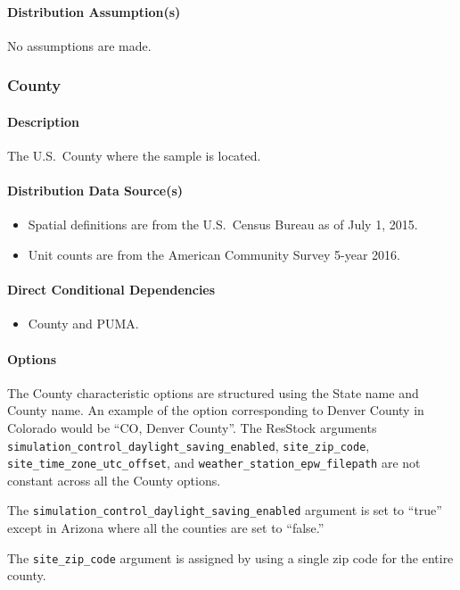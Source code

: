 \paragraph{Distribution Assumption(s)}
No assumptions are made.


\subsubsection{County}
\paragraph{Description}
The U.S.~County where the sample is located.

\paragraph{Distribution Data Source(s)}
\begin{itemize} 
\item
  Spatial definitions are from the U.S.~Census Bureau as of July 1,
  2015.
\item
  Unit counts are from the American Community Survey 5-year 2016.
\end{itemize}

\paragraph{Direct Conditional Dependencies}
\begin{itemize}
    \item County and PUMA.
\end{itemize}

\paragraph{Options}
The County characteristic options are structured using the State name and County name. An example of the option corresponding to Denver County in Colorado would be ``CO, Denver County''. The ResStock arguments \texttt{simulation\_control\_daylight\_saving\_enabled}, \texttt{site\_zip\_code}, \texttt{site\_time\_zone\_utc\_offset}, and \texttt{weather\_station\_epw\_filepath} are not constant across all the County options. 

The \texttt{simulation\_control\_daylight\_saving\_enabled} argument is set to ``true'' except in Arizona where all the counties are set to ``false.'' 

The \texttt{site\_zip\_code} argument is assigned by using a single zip code for the entire county.

